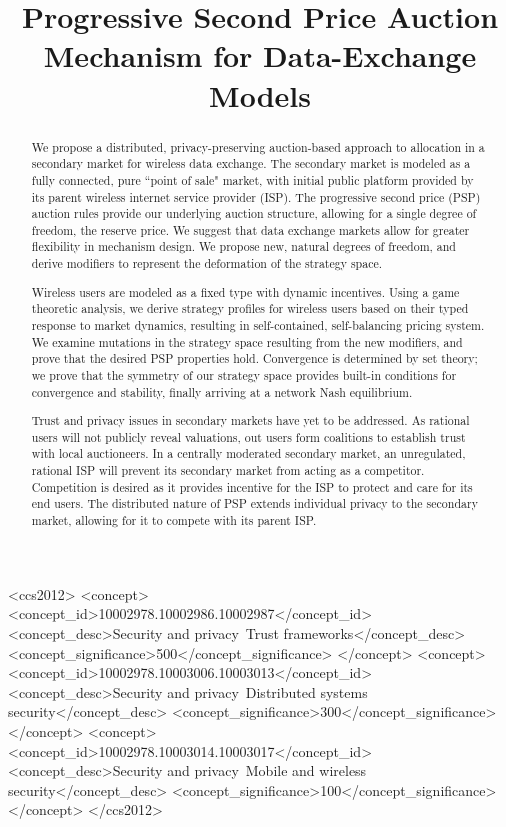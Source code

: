 \documentclass[sigconf, anonymous]{acmart}
\theoremstyle{definition}
\begin{document}
\title{Progressive Second Price Auction Mechanism for Data-Exchange Models} 

\begin{abstract}

We propose a distributed, privacy-preserving auction-based approach to
allocation in a secondary market for wireless data exchange.
The secondary market is modeled as a fully connected, pure ``point of sale"
market, with initial public platform provided by its parent wireless internet service
provider (ISP). 
The progressive second price (PSP) auction rules provide our underlying auction
structure, allowing for a single degree of freedom, the reserve
price. We suggest that data exchange markets allow for greater flexibility in
mechanism design.
We propose new, natural degrees of freedom, and derive modifiers
to represent the deformation of the strategy space. 

Wireless users are modeled as a fixed type with dynamic incentives. Using a game
theoretic analysis, we derive strategy profiles for wireless users
based on their typed response to market dynamics, resulting in self-contained, self-balancing pricing system. 
We examine mutations in the strategy space resulting from the new modifiers, and
prove that the desired PSP properties hold. 
Convergence is determined by set theory; we prove that the symmetry of our
strategy space provides built-in conditions for convergence and stability, finally arriving at a network Nash equilibrium.

Trust and privacy issues in secondary markets have yet to be addressed.
As rational users will not publicly reveal valuations, out users form coalitions to establish trust with local auctioneers.
In a centrally moderated secondary market, an unregulated,
rational ISP will prevent its secondary market from acting as a competitor.
Competition is desired as it provides incentive for the ISP to protect
and care for its end users.
The distributed nature of PSP extends individual privacy to the secondary market,
allowing for it to compete with its parent ISP. 
\end{abstract}

\begin{CCSXML}
<ccs2012>
<concept>
<concept_id>10002978.10002986.10002987</concept_id>
<concept_desc>Security and privacy~Trust frameworks</concept_desc>
<concept_significance>500</concept_significance>
</concept>
<concept>
<concept_id>10002978.10003006.10003013</concept_id>
<concept_desc>Security and privacy~Distributed systems security</concept_desc>
<concept_significance>300</concept_significance>
</concept>
<concept>
<concept_id>10002978.10003014.10003017</concept_id>
<concept_desc>Security and privacy~Mobile and wireless security</concept_desc>
<concept_significance>100</concept_significance>
</concept>
</ccs2012>
\end{CCSXML}
\end{document}
